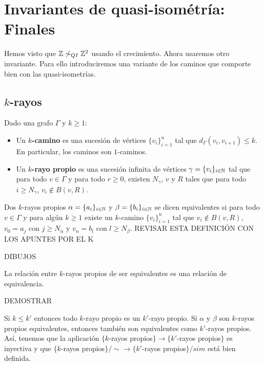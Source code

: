 \documentclass[twoside, 11pt]{article}
\begin{document}
\section{Invariantes de quasi-isométría: Finales}
Hemos visto que $\mathbb{Z}\not\sim_{QI}\mathbb{Z}^2$ usando el crecimiento. Ahora usaremos otro invariante. Para ello introduciremos una variante de los caminos que comporte bien con las quasi-isometrías. 
\subsection{$k$-rayos}
\begin{defi}
Dado una grafo $\Gamma$ y $k\geq 1$:
\begin{itemize}
\item Un \textbf{$k$-camino} es una sucesión de vértices $\{v_i\}_{i=1}^n$ tal que $d_\Gamma(v_i,v_{i+1})\leq k$. En particular, los caminos son $1$-caminos.
\item Un \textbf{$k$-rayo propio} es una sucesión infinita de vértices $\gamma=\{v_i\}_{i\in\mathbb{N}}$ tal que para todo $v\in \Gamma$ y para todo $r\geq 0$, existen $N_\gamma$, $v$ y $R$ tales que para todo $i\geq N_\gamma$, $v_i\notin B(v,R)$.  
\end{itemize}
Dos $k$-rayos propios $\alpha=\{a_i\}_{i\in \mathbb{N}}$ y $\beta=\{b_i\}_{i\in\mathbb{N}}$ se dicen equivalentes si para todo $v\in\Gamma$ y para algún $k\geq 1$ existe un $k$-camino $\{v_i\}_{i=1}^n$ tal que $v_i\notin B(v,R)$, $v_0=a_j$ con $j\geq N_\alpha$ y $v_n=b_l$ con $l\geq N_\beta$. REVISAR ESTA DEFINICIÓN CON LOS APUNTES POR EL K
\end{defi}
\begin{ejs}
DIBUJOS
\end{ejs}

\begin{prop}
La relación entre $k$-rayos propios de ser equivalentes es una relación de equivalencia.
\end{prop}
\begin{dem}
DEMOSTRAR 
\QED
\end{dem}

\begin{observacion}
Si $k\leq k'$ entonces todo $k$-rayo propio es un $k'$-rayo propio.  Si $\alpha$ y $\beta$ son $k$-rayos propios equivalentes, entonces también son equivalentes como $k'$-rayos propios. Así, tenemos que la aplicación $\{ k$-rayos propios$\}\longrightarrow\{k'$-rayos propios$\}$ es inyectiva y que $\{ k$-rayos propios$\}/\sim\longrightarrow\{k'$-rayos propios$\}/sim$ está bien definida.
\end{observacion}
\end{document}
